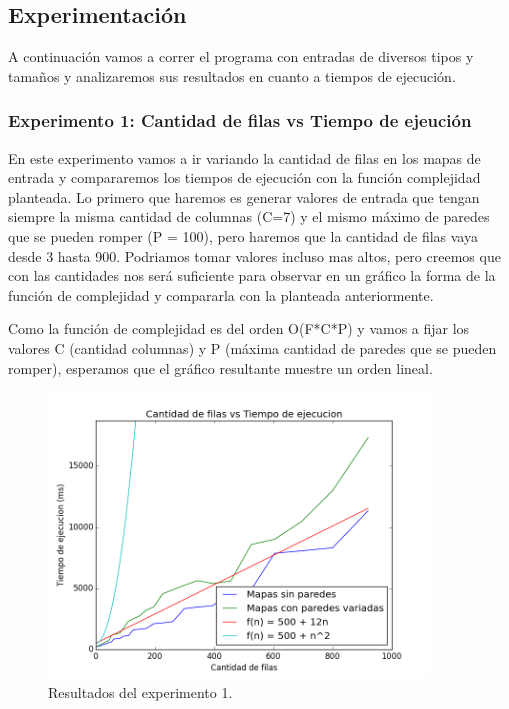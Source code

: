 \subsection{Experimentación}

\par A continuación vamos a correr el programa con entradas de diversos tipos y tamaños y analizaremos sus resultados en cuanto a tiempos de ejecución.

\subsubsection{Experimento 1: Cantidad de filas vs Tiempo de ejeución}

\par En este experimento vamos a ir variando la cantidad de filas en los mapas de entrada y compararemos los tiempos de ejecución con la función complejidad planteada. Lo primero que haremos es generar valores de entrada que tengan siempre la misma cantidad de columnas (C=7) y el mismo máximo de paredes que se pueden romper (P = 100), pero haremos que la cantidad de filas vaya desde 3 hasta 900. Podriamos tomar valores incluso mas altos, pero creemos que con las cantidades nos será suficiente para observar en un gráfico la forma de la función de complejidad y compararla con la planteada anteriormente.

\par Como la función de complejidad es del orden O(F*C*P) y vamos a fijar los valores C (cantidad columnas) y P (máxima cantidad de paredes que se pueden romper), esperamos que el gráfico resultante muestre un orden lineal.

\begin{figure}[H]
	\centering
	\includegraphics[width=0.9\textwidth]{Problema1/img/exp1_filas.png}
	\caption{Resultados del experimento 1.}
	\label{fig: ej1_exp1_filas}
\end{figure}

